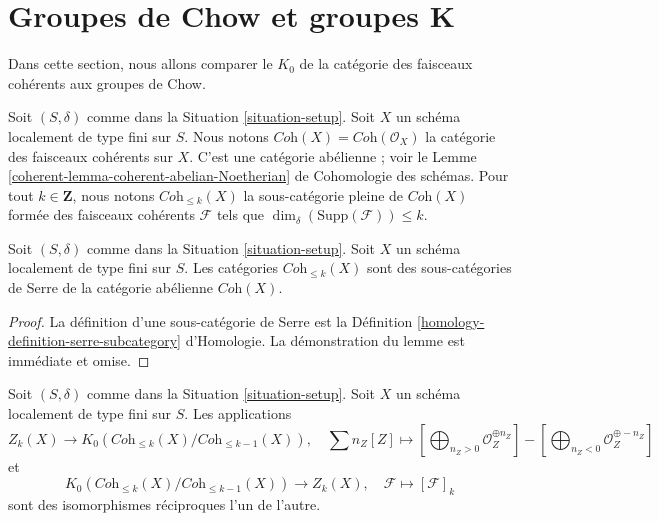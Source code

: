 \section{Groupes de Chow et groupes K}
\label{section-chow-and-K}

\noindent
Dans cette section, nous allons comparer le $K_0$ de la
catégorie des faisceaux cohérents aux groupes de Chow.

\medskip\noindent
Soit $(S, \delta)$ comme dans la Situation \ref{situation-setup}.
Soit $X$ un schéma localement de type fini sur $S$.
Nous notons $\textit{Coh}(X) = \textit{Coh}(\mathcal{O}_X)$
la catégorie des faisceaux cohérents sur $X$.
C'est une catégorie abélienne ; voir le
Lemme \ref{coherent-lemma-coherent-abelian-Noetherian} de Cohomologie des schémas.
Pour tout $k \in \mathbf{Z}$, nous notons $\textit{Coh}_{\leq k}(X)$
la sous-catégorie pleine de $\textit{Coh}(X)$
formée des faisceaux cohérents $\mathcal{F}$
tels que $\dim_\delta(\text{Supp}(\mathcal{F})) \leq k$.

\begin{lemma}
\label{lemma-Serre-subcategories}
Soit $(S, \delta)$ comme dans la Situation \ref{situation-setup}.
Soit $X$ un schéma localement de type fini sur $S$.
Les catégories $\textit{Coh}_{\leq k}(X)$ sont des sous-catégories de Serre
de la catégorie abélienne $\textit{Coh}(X)$.
\end{lemma}

\begin{proof}
La définition d'une sous-catégorie de Serre est la
Définition \ref{homology-definition-serre-subcategory} d'Homologie.
La démonstration du lemme est immédiate et omise.
\end{proof}

\begin{lemma}
\label{lemma-cycles-k-group}
Soit $(S, \delta)$ comme dans la Situation \ref{situation-setup}.
Soit $X$ un schéma localement de type fini sur $S$.
Les applications
$$
Z_k(X)
\longrightarrow
K_0(\textit{Coh}_{\leq k}(X)/\textit{Coh}_{\leq k - 1}(X)),
\quad
\sum n_Z[Z] \mapsto
\left[\bigoplus\nolimits_{n_Z > 0} \mathcal{O}_Z^{\oplus n_Z}\right]
-
\left[\bigoplus\nolimits_{n_Z < 0} \mathcal{O}_Z^{\oplus -n_Z}\right]
$$
et
$$
K_0(\textit{Coh}_{\leq k}(X)/\textit{Coh}_{\leq k - 1}(X))
\longrightarrow
Z_k(X),\quad
\mathcal{F} \longmapsto [\mathcal{F}]_k
$$
sont des isomorphismes réciproques l'un de l'autre.
\end{lemma}

